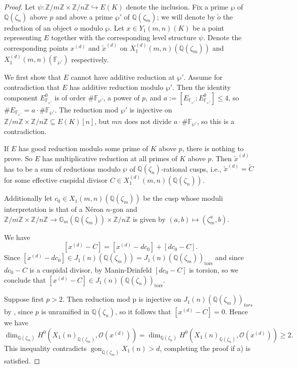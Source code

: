 \documentclass[11pt,reqno]{amsart}
\DeclareMathOperator{\gon}{gon}
\theoremstyle{definition}
\numberwithin{equation}{section}
\newcommand{\Q}{\mathbb{Q}}
\newcommand{\Z}{\mathbb{Z}}
\newcommand{\F}{\mathbb{F}}
\newcommand{\tor}{\mathrm{tors}}
\def\tg#1#2{\mathbb Z/#1\mathbb Z \times \mathbb Z /#2 \mathbb Z}
\begin{document}
\begin{proof}
    Let $\psi:\tg{m}{n} \hookrightarrow E(K)$ denote the inclusion. Fix a prime $\wp$ of $\Q(\zeta_n)$ above $p$ and above a prime $\wp'$ of $\Q(\zeta_m)$; we will denote by $\widetilde o$ the reduction of an object $o$ modulo $\wp$.  
    Let $x\in Y_1(m,n)(K)$ be a point representing $E$ together with the corresponding level structure $\psi$. Denote the corresponding points $x^{(d)}$ and $\tilde{x}^{(d)}$ on $X_1^{(d)}(m,n)(\Q(\zeta_m))$ and $ X_1^{(d)}(m,n)(\F_{\wp'})$ respectively.
    
     We first show that $E$ cannot have additive reduction at $\wp'.$ Assume for contradiction that $E$ has additive reduction modulo $\wp'.$ Then the identity component $E_{\F_{\wp'}}^0$ is of order $\#\F_{\wp'}$, a power of $p$, and $a:=[E_{\F_{\wp'}}:E_{\F_{\wp'}}^0]\leq 4$, so $\#E_{\F_{\wp'}}=a\cdot \#\F_{\wp'}$. The reduction mod $\wp'$ is injective on $\tg{m}{n}\subseteq E(K)[n]$, but $mn$ does not divide $a\cdot\#\F_{\wp'}$, so this is a contradiction. 

    If $E$ has good reduction modulo some prime of $K$ above $p$, there is nothing to prove. So $E$ has multiplicative reduction at all primes of $K$ above $p$. Then $\tilde{x}^{(d)}$ has to be a sum of reductions modulo $\wp$ of $\Q(\zeta_n)$-rational cusps, i.e., $\tilde{x}^{(d)}=\widetilde C$ for some effective cuspidal divisor $C \in X_1^{(d)}(m,n)(\Q(\zeta_n))$.

    Additionally let $c_0 \in X_1(m,n)(\Q(\zeta_m))$ be the cusp whose moduli interpretation is that of a N\'eron $n$-gon and $\tg{m}{n} \to \mathbb G_m(\Q(\zeta_m)) \times \Z/n\Z$ is given by $(a,b) \mapsto (\zeta_m^a,b)$.

    We have
    $$[x^{(d)}-C]=[x^{(d)}-dc_0]+[dc_0 -C].$$
    Since $[x^{(d)}-dc_0]\in J_1(n)(\Q(\zeta_m))=J_1(n)(\Q(\zeta_m))_{\tor}$ and since $dc_0 -C$ is a cuspidal divisor, by Manin-Drinfeld $[dc_0 -C]$ is torsion, so we conclude that $[x^{(d)}-C]\in J_1(n)(\Q(\zeta_n))_{\tor}$.
    
    Suppose first $p>2$. Then reduction mod p is injective on $J_1(n)(\Q(\zeta_m))_{tors}$ by \cite[Appendix]{katz81}, since $p$ is unramified in $\Q(\zeta_n)$, so it follows that $[x^{(d)}-C]=0$. Hence we have 
    $$\dim_{\Q(\zeta_m)} H^0(X_1(n)_{\Q(\zeta_m)}, \mathcal O(x^{(d)}))=\dim_{\Q(\zeta_n)} H^0(X_1(n)_{\Q(\zeta_n)}, \mathcal O(x^{(d)}))\geq 2.$$
    This inequality contradicts $\gon_{\Q(\zeta_m)} X_1(n)> d$, completing the proof if a) is satisfied.


\end{proof}
\end{document}
